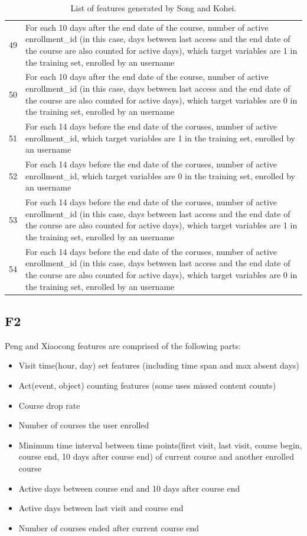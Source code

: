\begin{center}
\begin{table}[ht]
\begin{minipage}{\textwidth}
{\begin{tabular}{|l|l|}
      49 & For each 10 days after the end date of the course, number of active enrollment\_id (in this case, days between last access and the end date of the course are also counted for active days), which target variables are 1 in the training set, enrolled by an username \tabularnewline 
      50 & For each 10 days after the end date of the course, number of active enrollment\_id (in this case, days between last access and the end date of the course are also counted for active days), which target variables are 0 in the training set, enrolled by an username \tabularnewline 
      51 & For each 14 days before the end date of the coruses, number of active enrollment\_id, which target variables are 1 in the training set, enrolled by an username \tabularnewline 
      52 & For each 14 days before the end date of the coruses, number of active enrollment\_id, which target variables are 0 in the training set, enrolled by an username \tabularnewline 
      53 & For each 14 days before the end date of the coruses, number of active enrollment\_id (in this case, days between last access and the end date of the course are also counted for active days), which target variables are 1 in the training set, enrolled by an username \tabularnewline 
      54 & For each 14 days before the end date of the coruses, number of active enrollment\_id (in this case, days between last access and the end date of the course are also counted for active days), which target variables are 0 in the training set, enrolled by an username \tabularnewline 
      \hline
      \end{tabular}
    }
    \hfill{}
    \caption{List of features generated by Song and Kohei.}
    \label{tb:skfeature}
    \end{minipage}
  \end{table}
\end{center}

\subsection{F2}
Peng and Xiaocong features are comprised of the following parts:
\begin{itemize}
  \setlength\itemsep{0em}
  \item Visit time(hour, day) set features (including time span and max absent days)
  \item Act(event, object) counting features (some uses missed content counts)
  \item Course drop rate
  \item Number of courses the user enrolled
  \item Minimum time interval between time points(first visit, last visit, course begin, course end, 10 days after course end) of current course and another enrolled course
  \item Active days between course end and 10 days after course end
  \item Active days between last visit and course end
  \item Number of courses ended after current course end
\end{itemize}

